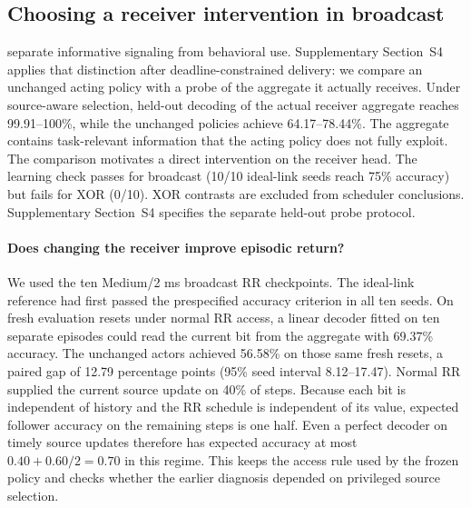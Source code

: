 \documentclass[a4paper,fleqn]{cas-dc}
\begin{document}
\FloatBarrier
\subsection{Choosing a receiver intervention in broadcast}\label{sec:receiver_decision}
\citet{lowe2019pitfalls} separate informative signaling from behavioral use. Supplementary Section~S4 applies that distinction after deadline-constrained delivery: we compare an unchanged acting policy with a probe of the aggregate it actually receives. Under source-aware selection, held-out decoding of the actual receiver aggregate reaches 99.91--100\%, while the unchanged policies achieve 64.17--78.44\%. The aggregate contains task-relevant information that the acting policy does not fully exploit. The comparison motivates a direct intervention on the receiver head. The learning check passes for broadcast (10/10 ideal-link seeds reach 75\% accuracy) but fails for XOR (0/10). XOR contrasts are excluded from scheduler conclusions. Supplementary Section~S4 specifies the separate held-out probe protocol.
\paragraph{Does changing the receiver improve episodic return?}
We used the ten Medium/2 ms broadcast RR checkpoints. The ideal-link reference had first passed the prespecified accuracy criterion in all ten seeds. On fresh evaluation resets under normal RR access, a linear decoder fitted on ten separate episodes could read the current bit from the aggregate with 69.37\% accuracy. The unchanged actors achieved 56.58\% on those same fresh resets, a paired gap of 12.79 percentage points (95\% seed interval 8.12--17.47). Normal RR supplied the current source update on 40\% of steps. Because each bit is independent of history and the RR schedule is independent of its value, expected follower accuracy on the remaining steps is one half. Even a perfect decoder on timely source updates therefore has expected accuracy at most $0.40+0.60/2=0.70$ in this regime. This keeps the access rule used by the frozen policy and checks whether the earlier diagnosis depended on privileged source selection.
\end{document}
